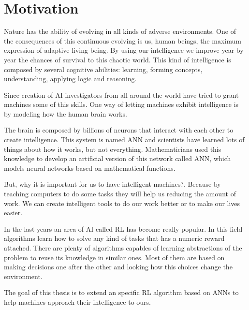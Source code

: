 \chapter{Motivation}
Nature has the ability of evolving in all kinds of adverse environments.
One of the consequences of this continuous evolving is us, human beings,
the maximum expression of adaptive living being.
By using our intelligence we improve year by year the chances of survival
to this chaotic world.
This kind of intelligence is composed by several cognitive abilities: learning,
forming concepts, understanding, applying logic and reasoning.

Since creation of \acf{AI} investigators from all around
the world have tried to grant machines some of this skills.
One way of letting machines exhibit intelligence is by modeling how the human brain works.

The brain is composed by billions of neurons that interact with each other to create intelligence.
This system is named \acf{ANN} and scientists have learned lots of things about how it works,
but not everything.
Mathematicians used this knowledge to develop an artificial version of this network called
\acf{ANN}, which models neural networks based on mathematical functions.

But, why it is important for us to have intelligent machines?.
Because by teaching computers to do some tasks they will help us reducing the amount of work.
We can create intelligent tools to do our work better or to make our lives easier.

In the last years an area of \ac{AI} called \acf{RL} has become really popular.
In this field algorithms learn how to solve any kind of tasks that has a numeric reward attached.
There are plenty of algorithms capables of learning abstractions of the problem to reuse its knowledge in similar ones.
Most of them are based on making decisions one after the other and looking how this choices change the environment.

The goal of this thesis is to extend an specific \ac{RL} algorithm based on \acp{ANN} to help machines approach their
intelligence to ours.

